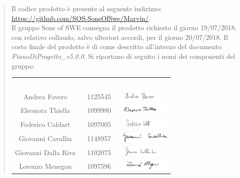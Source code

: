 \documentclass{letter}
\newcommand{\PdP}{\emph{PianoDiProgetto\_v5.0.0}}
\begin{document}
\begin{letter}
\begin{quotation}
	Il codice prodotto è presente al seguente indirizzo:
	\href{https://github.com/SOS-SonsOfSwe/Marvin/}{https://github.com/SOS-SonsOfSwe/Marvin/}.\\
	Il gruppo Sons of SWE consegna il prodotto richiesto il giorno 19/07/2018, con relativo collaudo, salvo ulteriori accordi, per il giorno 20/07/2018. Il costo finale del prodotto è di  come descritto all'interno del documento \PdP{}.
	\newpage 
	Si riportano di seguito i nomi dei componenti del gruppo:\\
	\begin{longtable}{ c  c  c }
		\rowcolor{greySOS}
		\textcolor{white}{\textbf{Nominativo}} & \textcolor{white}{\textbf{Matricola}} & \textcolor{white}{\textbf{Firma}}\\
		Andrea Favero & 1125545 & \includegraphics[height=0.5cm]{firme/AndreaFavero.png} \\
		
		Eleonora Thiella & 1099980 & \includegraphics[height=0.5cm]{firme/EleonoraThiella.png} \\
		
		Federico Caldart & 1097005 & \includegraphics[height=0.5cm]{firme/FedericoCaldart.png} \\
		
		Giovanni Cavallin & 1148957 & \includegraphics[height=0.5cm]{firme/GiovanniCavallin.png} \\
		
		Giovanni Dalla Riva & 1102075 & \includegraphics[height=0.5cm]{firme/GiovanniDallaRiva.png} \\
		
		Lorenzo Menegon & 1097596 & \includegraphics[height=0.5cm]{firme/LorenzoMenegon.png} \\
		

\end{longtable}
\end{quotation}
\end{letter}
\end{document}
